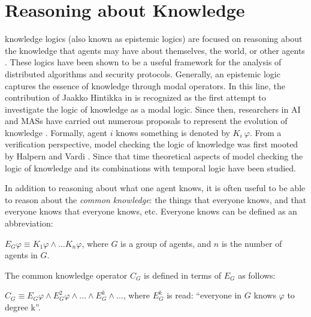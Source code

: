 \section{Reasoning about Knowledge} \label{sec:knowledge-cha2}

knowledge logics (also known as epistemic logics) are focused on reasoning about the knowledge that agents may have about themselves, the world, or other agents \cite{Fagin1995}. These logics have been shown to be a useful framework for the analysis of distributed algorithms and security protocols. Generally, an epistemic logic captures the essence of knowledge through modal operators. In this line, the contribution of Jaakko Hintikka in \cite{Hintikka1962} is recognized as the first attempt to investigate the logic of knowledge as a modal logic. Since then, researchers in AI and MASs have carried out numerous proposals to represent the evolution of knowledge \cite{Delgado2009,Fagin1995,Halpern2003,Huang2011,Lomuscio2007,Lomuscio2012,Meyer1995,Wan2013}. Formally, agent $i$ knows something is denoted by $K_i~\varphi$. From a verification perspective, model checking the logic of knowledge was first mooted by Halpern and Vardi \cite{Halpern1991}. Since that time theoretical aspects of model checking the logic of knowledge and its combinations with temporal logic have been studied. %

In addition to reasoning about what one agent knows, it is often useful to be able to reason about the \textit{common knowledge}: the things that everyone knows, and that everyone knows that everyone knows, etc. Everyone knows can be defined as an abbreviation:

\noindent $E_G \varphi \equiv K_1 \varphi \wedge \dots K_n \varphi$, where $G$ is a group of agents, and $n$ is the number of agents in $G$.

\noindent The common knowledge operator $C_G$ is defined in terms of $E_G$ as follows:

\noindent $C_G \equiv E_G \varphi \wedge E_G^2 \varphi \wedge \dots \wedge E_G^k \wedge \dots $, where $E_G^k$ is read: ``everyone in $G$ knows $\varphi$ to degree k''.




